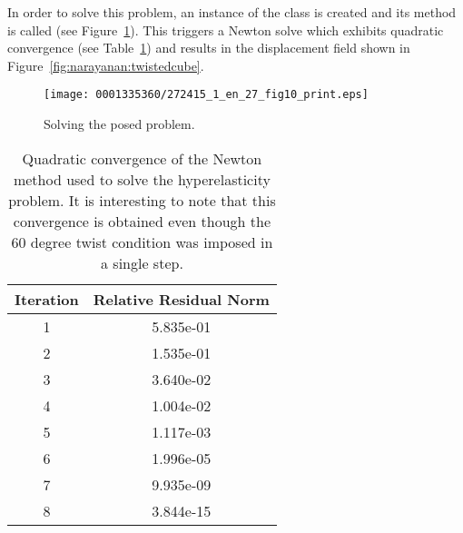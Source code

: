 \makeatletter
\def\img@cmode{\hskip-5pt\begin{turn}{90}\rlap{\kern1.5\p@\@img@cmode{\@cmodetext}}\end{turn}}
\makeatother

In order to solve this problem, an instance of the  class
is created and its  method is called (see
Figure~\ref{code:narayanan:solveproblem}). This triggers a Newton
solve which exhibits quadratic convergence (see
Table~\ref{tab:narayanan:residualnorms}) and results in the
displacement field shown in
Figure~\ref{fig:narayanan:twistedcube}.

\begin{figure}[!t]
\texttt{[image: 0001335360/272415\_1\_en\_27\_fig10\_print.eps]}
\caption{Solving the posed problem.}
\label{code:narayanan:solveproblem}
\end{figure}

\begin{table}
  \centering
    \begin{tabular}{cc}
      \toprule
      Iteration & Relative Residual Norm \\
      \midrule
      1 & 5.835e-01\\
      2 & 1.535e-01\\
      3 & 3.640e-02\\
      4 & 1.004e-02\\
      5 & 1.117e-03\\
      6 & 1.996e-05\\
      7 & 9.935e-09\\
      8 & 3.844e-15\\
      \bottomrule
    \end{tabular}
    \caption{Quadratic convergence of the Newton method used to solve
      the hyperelasticity problem. It is interesting to note that this
      convergence is obtained even though the 60 degree twist
      condition was imposed in a single step.}
    \label{tab:narayanan:residualnorms}
\end{table}

